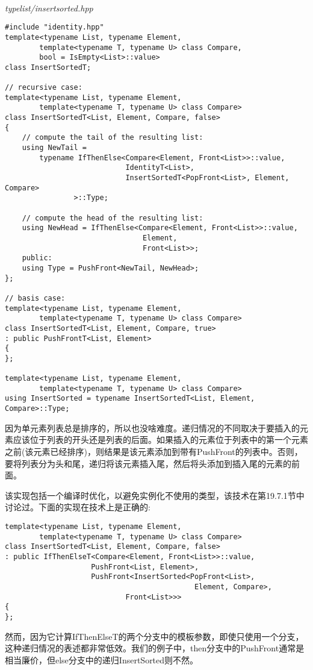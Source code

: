 \hspace*{\fill} \\ %
\noindent
\textit{typelist/insertsorted.hpp}
\begin{lstlisting}[style=styleCXX]
#include "identity.hpp"
template<typename List, typename Element,
		template<typename T, typename U> class Compare,
		bool = IsEmpty<List>::value>
class InsertSortedT;

// recursive case:
template<typename List, typename Element,
		template<typename T, typename U> class Compare>
class InsertSortedT<List, Element, Compare, false>
{
	// compute the tail of the resulting list:
	using NewTail =
		typename IfThenElse<Compare<Element, Front<List>>::value,
							IdentityT<List>,
							InsertSortedT<PopFront<List>, Element, Compare>
				>::Type;
				
	// compute the head of the resulting list:
	using NewHead = IfThenElse<Compare<Element, Front<List>>::value,
								Element,
								Front<List>>;
	public:
	using Type = PushFront<NewTail, NewHead>;
};

// basis case:
template<typename List, typename Element,
		template<typename T, typename U> class Compare>
class InsertSortedT<List, Element, Compare, true>
: public PushFrontT<List, Element>
{
};

template<typename List, typename Element,
		template<typename T, typename U> class Compare>
using InsertSorted = typename InsertSortedT<List, Element, Compare>::Type;
\end{lstlisting}

因为单元素列表总是排序的，所以也没啥难度。递归情况的不同取决于要插入的元素应该位于列表的开头还是列表的后面。如果插入的元素位于列表中的第一个元素之前(该元素已经排序)，则结果是该元素添加到带有PushFront的列表中。否则，要将列表分为头和尾，递归将该元素插入尾，然后将头添加到插入尾的元素的前面。

该实现包括一个编译时优化，以避免实例化不使用的类型，该技术在第19.7.1节中讨论过。下面的实现在技术上是正确的:

\begin{lstlisting}[style=styleCXX]
template<typename List, typename Element,
		template<typename T, typename U> class Compare>
class InsertSortedT<List, Element, Compare, false>
: public IfThenElseT<Compare<Element, Front<List>>::value,
					PushFront<List, Element>,
					PushFront<InsertSorted<PopFront<List>,
											Element, Compare>,
							Front<List>>>
{
};
\end{lstlisting}

然而，因为它计算IfThenElseT的两个分支中的模板参数，即使只使用一个分支，这种递归情况的表述都非常低效。我们的例子中，then分支中的PushFront通常是相当廉价，但else分支中的递归InsertSorted则不然。

